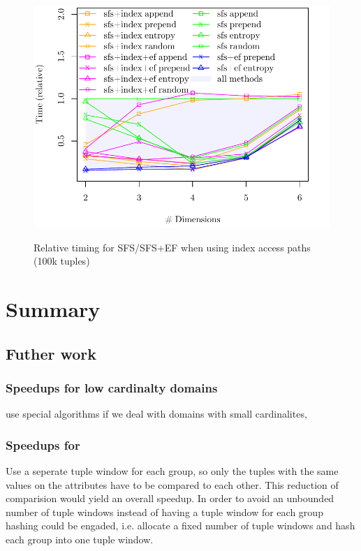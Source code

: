 \begin{figure}[htbp]
\begin{minipage}{\onecolumnwidth}
{\includegraphics[width=\onecolumnwidth]{plots-profile/sfs-index-a-100000}}%
\caption{Relative timing for SFS/SFS+EF when using index access paths 
(100k tuples)}%
\end{minipage}%
\end{figure}




\chapter{Summary}

\section{Futher work}

\subsection{Speedups for low cardinalty domains}
%
use special algorithms if we deal with domains with small
cardinalites, \citep{Preisinger2006, Preisinger2007, Morse2007}

\subsection{Speedups for }
%
Use a seperate tuple window for each 
group, so only the tuples with the same values on the
 attributes have to be compared to each
other. This reduction of comparision would yield an overall speedup.
In order to avoid an unbounded number of tuple windows instead of
having a tuple window for each  group
hashing could be engaded, i.e. allocate a fixed number of tuple
windows and hash each  group into one tuple
window.


